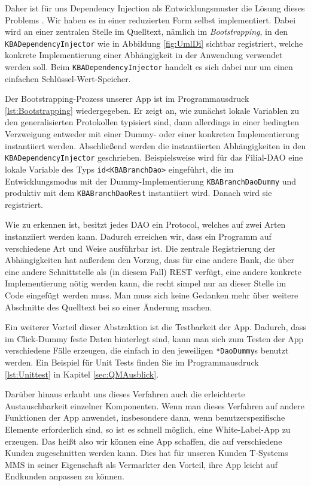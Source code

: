 	Daher ist für uns Dependency Injection als Entwicklungsmuster die Lösung dieses Problems \citep{Jenkov14}. Wir haben es in einer reduzierten Form selbst implementiert. Dabei wird an einer zentralen Stelle im Quelltext, nämlich im \emph{Bootstrapping}, in den \lstinline{KBADependencyInjector} wie in Abbildung \ref{fig:UmlDi} sichtbar registriert, welche konkrete Implementierung einer Abhängigkeit in der Anwendung verwendet werden soll. Beim \lstinline{KBADependencyInjector} handelt es sich dabei nur um einen einfachen Schlüssel-Wert-Speicher.
	
	Der Bootstrapping-Prozess unserer App ist im Programmausdruck \ref{lst:Bootstrapping} wiedergegeben. Er zeigt an, wie zunächst lokale Variablen zu den generalisierten Protokollen typisiert sind, dann allerdings in einer bedingten Verzweigung entweder mit einer Dummy- oder einer konkreten Implementierung instantiiert werden. Abschließend werden die instantiierten Abhängigkeiten in den \lstinline{KBADependencyInjector} geschrieben. Beispielsweise wird für das Filial-\ac{DAO} eine lokale Variable des Typs \lstinline{id<KBABranchDao>} eingeführt, die im Entwicklungsmodus mit der Dummy-Implementierung \lstinline{KBABranchDaoDummy} und produktiv mit dem \lstinline{KBABranchDaoRest} instantiiert wird. Danach wird sie registriert.
	\pagebreak
	
	
\noindent	Wie zu erkennen ist, besitzt jedes \ac{DAO} ein Protocol, welches auf zwei Arten instanziiert werden kann. Dadurch erreichen wir, dass ein Programm auf verschiedene Art und Weise ausführbar ist. Die zentrale Registrierung der Abhängigkeiten hat außerdem den Vorzug, dass für eine andere Bank, die über eine andere Schnittstelle als (in diesem Fall) \ac{REST} verfügt, eine andere konkrete Implementierung nötig werden kann, die recht simpel nur an dieser Stelle im Code eingefügt werden muss. Man muss sich keine Gedanken mehr über weitere Abschnitte des Quelltext bei so einer Änderung machen.
	
	Ein weiterer Vorteil dieser Abstraktion ist die Testbarkeit der App. Dadurch, dass im Click-Dummy feste Daten hinterlegt sind, kann man sich zum Testen der App verschiedene Fälle erzeugen, die einfach in den jeweiligen \lstinline{*DaoDummy}s benutzt werden. Ein Beispiel für Unit Tests finden Sie im Programmausdruck \ref{lst:Unittest} in Kapitel \ref{sec:QMAusblick}.
	
	Darüber hinaus erlaubt uns dieses Verfahren auch die erleichterte Austauschbarkeit einzelner Komponenten. Wenn man dieses Verfahren auf andere Funktionen der App anwendet, insbesondere dann, wenn benutzerspezifische Elemente erforderlich sind, so ist es schnell möglich, eine White-Label-App zu erzeugen. Das heißt also wir können eine App schaffen, die auf verschiedene Kunden zugeschnitten werden kann. Dies hat für unseren Kunden T-Systems MMS in seiner Eigenschaft als Vermarkter den Vorteil, ihre App leicht auf Endkunden anpassen zu können.
	
